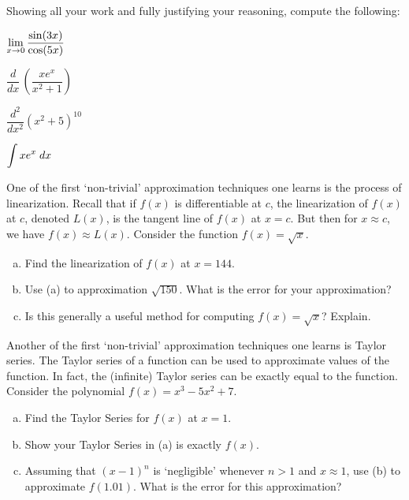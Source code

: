 \documentclass[11pt,letterpaper]{article}
\begin{document}

 Showing all your work and fully justifying your reasoning, compute the following:
	\begin{2enumerate}
	\item $\displaystyle \lim_{x \to 0} \dfrac{\sin(3x)}{\cos(5x)}$
	\item $\dfrac{d}{dx}\, \left( \dfrac{x e^x}{x^2 + 1} \right)$
	\item $\dfrac{d^2}{dx^2} (x^2 + 5)^{10}$
	\item $\displaystyle \int x e^x \; dx$
	\end{2enumerate}



\newpage 



 One of the first `non-trivial' approximation techniques one learns is the process of linearization. Recall that if $f(x)$ is differentiable at $c$, the linearization of $f(x)$ at $c$, denoted $L(x)$, is the tangent line of $f(x)$ at $x= c$. But then for $x \approx c$, we have $f(x) \approx L(x)$. Consider the function $f(x)= \sqrt{x}$. 
	\begin{enumerate}[(a)]
	\item Find the linearization of $f(x)$ at $x= 144$. 
	\item Use (a) to approximation $\sqrt{150}$. What is the error for your approximation?
	\item Is this generally a useful method for computing $f(x)= \sqrt{x}$? Explain. 
	\end{enumerate}



\newpage



 Another of the first `non-trivial' approximation techniques one learns is Taylor series. The Taylor series of a function can be used to approximate values of the function. In fact, the (infinite) Taylor series can be exactly equal to the function. Consider the polynomial $f(x)= x^3 - 5x^2 + 7$. 
	\begin{enumerate}[(a)]
	\item Find the Taylor Series for $f(x)$ at $x= 1$. 
	\item Show your Taylor Series in (a) is exactly $f(x)$. 
	\item Assuming that $(x - 1)^n$ is `negligible' whenever $n > 1$ and $x \approx 1$, use (b) to approximate $f(1.01)$. What is the error for this approximation? 
	\end{enumerate}
\end{document}
